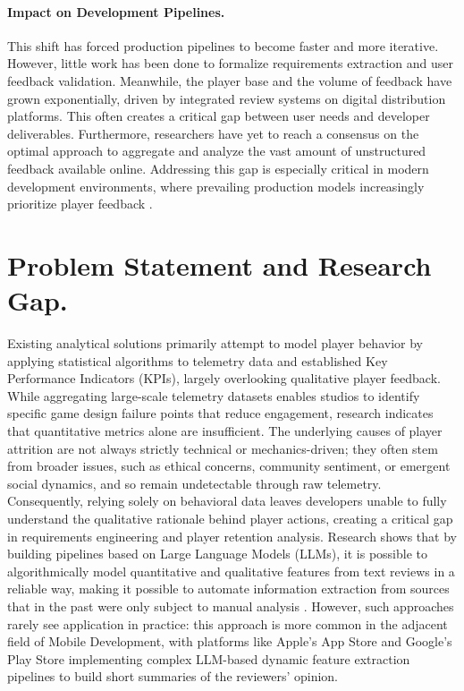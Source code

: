 \paragraph{Impact on Development Pipelines.}
This shift has forced production pipelines to become faster and more iterative. However, little work has been done to formalize requirements extraction and user feedback validation. Meanwhile, the player base and the volume of feedback have grown exponentially, driven by integrated review systems on digital distribution platforms. This often creates a critical gap between user needs and developer deliverables. Furthermore, researchers have yet to reach a consensus on the optimal approach to aggregate and analyze the vast amount of unstructured feedback available online. Addressing this gap is especially critical in modern development environments, where prevailing production models increasingly prioritize player feedback \cite{ea_steam, feedback_analysis_game_dev}.

\section{Problem Statement and Research Gap.}
\noindent Existing analytical solutions primarily attempt to model player behavior by applying statistical algorithms to telemetry data and established Key Performance Indicators (KPIs), largely overlooking qualitative player feedback. While aggregating large-scale telemetry datasets enables studios to identify specific game design failure points that reduce engagement, research indicates that quantitative metrics alone are insufficient. 
The underlying causes of player attrition are not always strictly technical or mechanics-driven; they often stem from broader issues, such as ethical concerns, community sentiment, or emergent social dynamics, and so remain undetectable through raw telemetry. Consequently, relying solely on behavioral data leaves developers unable to fully understand the qualitative rationale behind player actions, creating a critical gap in requirements engineering and player retention analysis. Research shows that by building pipelines based on Large Language Models (LLMs), it is possible to algorithmically model quantitative and qualitative features from text reviews in a reliable way, making it possible to automate information extraction from sources that in the past were only subject to manual analysis \cite{abdelqader_2025_using_generative_ai_enjoyment}. However, such approaches rarely see application in practice: this approach is more common in the adjacent field of Mobile Development, with platforms like Apple's App Store and Google's Play Store implementing complex LLM-based dynamic feature extraction pipelines to build short summaries of the reviewers' opinion.

